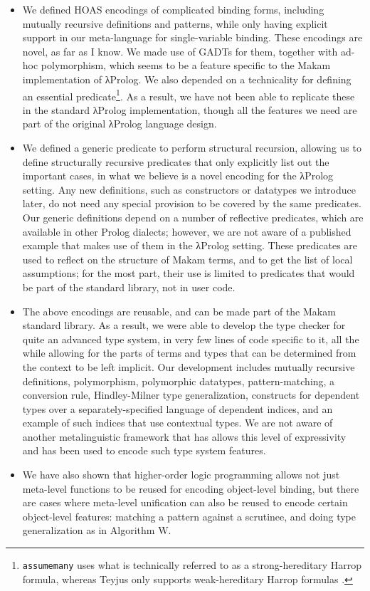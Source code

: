 \begin{itemize}
\item
  We defined HOAS encodings of complicated binding forms, including
  mutually recursive definitions and patterns, while only having
  explicit support in our meta-language for single-variable binding.
  These encodings are novel, as far as I know. We made use of GADTs for
  them, together with ad-hoc polymorphism, which seems to be a feature
  specific to the Makam implementation of \foreignlanguage{greek}{λ}Prolog. We also depended on a
  technicality for defining an essential
  predicate\footnote{\texttt{assumemany} uses what is technically referred to
    as a strong-hereditary Harrop formula, whereas Teyjus only supports weak-hereditary
    Harrop formulas \citep{nadathur1999system}.}. As a result, we have
  not been able to replicate these in the standard \foreignlanguage{greek}{λ}Prolog
  implementation, though all the features we need are part of the
  original \foreignlanguage{greek}{λ}Prolog language design.
\item
  We defined a generic predicate to perform structural recursion,
  allowing us to define structurally recursive predicates that only
  explicitly list out the important cases, in what we believe is a novel
  encoding for the \foreignlanguage{greek}{λ}Prolog setting. Any new definitions, such as
  constructors or datatypes we introduce later, do not need any special
  provision to be covered by the same predicates. Our generic
  definitions depend on a number of reflective predicates, which are
  available in other Prolog dialects; however, we are not aware of a
  published example that makes use of them in the \foreignlanguage{greek}{λ}Prolog setting. These
  predicates are used to reflect on the structure of Makam terms, and to
  get the list of local assumptions; for the most part, their use is
  limited to predicates that would be part of the standard library, not
  in user code.
\item
  The above encodings are reusable, and can be made part of the Makam
  standard library. As a result, we were able to develop the type
  checker for quite an advanced type system, in very few lines of code
  specific to it, all the while allowing for the parts of terms and
  types that can be determined from the context to be left implicit. Our
  development includes mutually recursive definitions, polymorphism,
  polymorphic datatypes, pattern-matching, a conversion rule,
  Hindley-Milner type generalization, constructs for dependent types
  over a separately-specified language of dependent indices, and an
  example of such indices that use contextual types. We are not aware of
  another metalinguistic framework that has allows this level of
  expressivity and has been used to encode such type system features.
\item
  We have also shown that higher-order logic programming allows not just
  meta-level functions to be reused for encoding object-level binding,
  but there are cases where meta-level unification can also be reused to
  encode certain object-level features: matching a pattern against a
  scrutinee, and doing type generalization as in Algorithm W.
\end{itemize}

